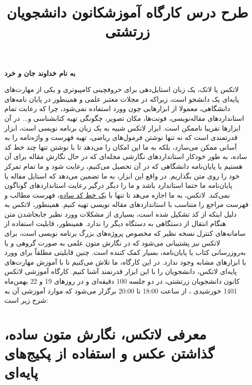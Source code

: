 \documentclass{article}
\begin{document}
\textbf{به نام خداوند جان و خرد}
\begin{flushright}
\vspace{5mm}
\title*{\textbf{\fontsize{31pt}{36pt}\selectfont \textcolor{BrickRed}{طرح درس کارگاه آموزش}}}
\end{flushright}
\title*{\textbf{\fontsize{180pt}{36pt}\selectfont \textcolor{BrickRed}{\lr{\LaTeX}}}}
\begin{flushleft}
\title*{\textbf{\fontsize{31pt}{36pt}\selectfont \textcolor{BrickRed}{کانون دانشجویان زرتشتی}}}
\end{flushleft}
\vspace{5mm}

 \noindent لاتکس یا لاتک، یک زبان استایل‌دهی برای حروفچینی کامپیوتری و یکی از مهارت‌های پایه‌ای یک دانشجو است، زیراکه در مجلات معتبر علمی و همینطور در پایان نامه‌های دانشگاهی، معمولا از ابزارهایی چون وورد استفاده نمی‌شود، چرا که رعایت تمام استاندارد‌های مقاله‌نویسی، فونت‌‌‌‌‌‌‌‌‌‌‌‌‌‌‌‌‌‌‌‌‌ها، مکان تصویر، چگونگی تهیه کتابشناسی و... در آن ابزارها تقریبا ناممکن است. ابزار لاتکس شبیه به یک زبان برنامه نویسی است، ابزار قدرتمندی است که نه تنها نوشتن فرمول‌های ریاضی، تهیه فهرست و واژه‌نامه را به آسانی ممکن می‌سازد، بلکه به ما این امکان را می‌دهد تا با نوشتن تنها چند خط کد ساده، به طور خودکار استانداردهای نگارشی مجله‌ای که در حال نگارش مقاله برای آن هستیم یا پایان‌نامه دانشگاهی که در آن تحصیل می‌کنیم، رعایت شود و ما تمام تمرکز خود را روی متن بگذاریم. در واقع این ابزار، به ما تضمین می‌دهد که استایل مقاله یا پایان‌نامه ما حتما استاندارد باشد و ما را دیگر درگیر رعایت استانداردهای گوناگون نمی‌کند. لاتکس، به ما اجازه می‌هد تا تنها با \underline{یک خط کد ساده}، فهرست مطالب و فهرست مراجع را متناسب با استانداردهای مقاله نویسی تهیه کنیم. همینطور، لاتکس به دلیل اینکه از کد تشکیل شده است، بسیاری از مشکلات وورد نظیر جابجاشدن متن هنگام انتقال از دستگاهی به دستگاه دیگر را ندارد. همینطور، قابلیت استفاده از سامانه‌های کنترل نسخه نظیر  که مخصوص پروژه‌های بزرگ برنامه نویسی است، برای لاتکس نیز پشتیبانی می‌شود که در نگارش متون علمی به صورت گروهی و یا به‌روزرسانی کتاب یا پایان‌نامه، بسیار کمک کننده است. چنین قابلیتی مطلقاً برای وورد یا ابزارهای مشابه وجود ندارد. در این کارگاه، ما تلاش می‌کنیم تا با آموزش مهارت‌های پایه‌ای لاتکس، دانشجویان را با این ابزار قدرتمند آشنا کنیم.
\newpage
\noindent کارگاه آموزشی لاتکس کانون دانشجویان زرتشتی، در دو جلسه 100 دقیقه‌ای و در روزهای 19 و 22 بهمن‌ماه 1401 خورشیدی ، از ساعت 18:00 تا 20:00 برگزار می‌شود که موارد آموزشی آن به شرح زیر است:




\section{معرفی لاتکس، نگارش متون ساده، گذاشتن عکس و استفاده از پکیج‌های پایه‌ای}
\end{document}
